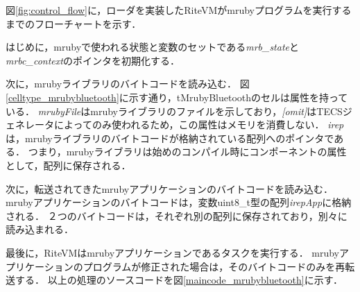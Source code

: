 \documentclass[submit,techrep]{ipsj}
\begin{document}
図\ref{fig:control_flow}に，ローダを実装したRiteVMがmrubyプログラムを実行するまでのフローチャートを示す．

はじめに，mrubyで使われる状態と変数のセットである{\it mrb\_state}と{\it mrbc\_context}のポインタを初期化する．

次に，mrubyライブラリのバイトコードを読み込む．
図\ref{celltype_mrubybluetooth}に示す通り，tMrubyBluetoothのセルは属性を持っている．
{\it mrubyFile}はmrubyライブラリのファイルを示しており，{\it [omit]}はTECSジェネレータによってのみ使われるため，この属性はメモリを消費しない．
{\it irep}は，mrubyライブラリのバイトコードが格納されている配列へのポインタである．
つまり，mrubyライブラリは始めのコンパイル時にコンポーネントの属性として，配列に保存される．

次に，転送されてきたmrubyアプリケーションのバイトコードを読み込む．
mrubyアプリケーションのバイトコードは，変数uint8\_t型の配列{\it irepApp}に格納される．
２つのバイトコードは，それぞれ別の配列に保存されており，別々に読み込まれる．

最後に，RiteVMはmrubyアプリケーションであるタスクを実行する．
mrubyアプリケーションのプログラムが修正された場合は，そのバイトコードのみを再転送する．
以上の処理のソースコードを図\ref{maincode_mrubybluetooth}に示す．
\end{document}
